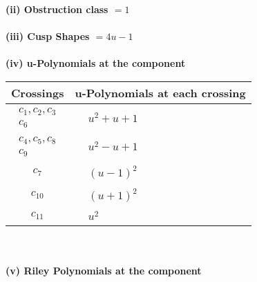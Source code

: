 \documentclass[1p]{elsarticle_modified}
\theoremstyle{definition}
\begin{document}
\flushleft \textbf{(ii) Obstruction class $= 1$}\\~\\
\flushleft \textbf{(iii) Cusp Shapes $= 4 u-1$}\\~\\
\newpage\renewcommand{\arraystretch}{1}
\flushleft \textbf{(iv) u-Polynomials at the component}\newline \\
\begin{tabular}{m{50pt}|m{274pt}}
Crossings & \hspace{64pt}u-Polynomials at each crossing \\
\hline $$\begin{aligned}c_{1},c_{2},c_{3}\\c_{6}\end{aligned}$$&$\begin{aligned}
&u^2+u+1
\end{aligned}$\\
\hline $$\begin{aligned}c_{4},c_{5},c_{8}\\c_{9}\end{aligned}$$&$\begin{aligned}
&u^2- u+1
\end{aligned}$\\
\hline $$\begin{aligned}c_{7}\end{aligned}$$&$\begin{aligned}
&(u-1)^2
\end{aligned}$\\
\hline $$\begin{aligned}c_{10}\end{aligned}$$&$\begin{aligned}
&(u+1)^2
\end{aligned}$\\
\hline $$\begin{aligned}c_{11}\end{aligned}$$&$\begin{aligned}
&u^2
\end{aligned}$\\
\hline
\end{tabular}\\~\\
\newpage\renewcommand{\arraystretch}{1}
\flushleft \textbf{(v) Riley Polynomials at the component}\newline \\
\end{document}
